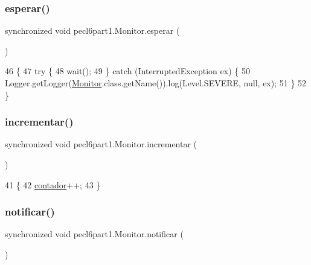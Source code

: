 \subsubsection{\texorpdfstring{esperar()}{esperar()}}
{\footnotesize\ttfamily synchronized void pecl6part1.\+Monitor.\+esperar (\begin{DoxyParamCaption}{ }\end{DoxyParamCaption})\hspace{0.3cm}{\ttfamily [inline]}}


\begin{DoxyCode}
46     \{
47         \textcolor{keywordflow}{try} \{
48             wait();
49         \} \textcolor{keywordflow}{catch} (InterruptedException ex) \{
50             Logger.getLogger(\mbox{\hyperlink{classpecl6part1_1_1_monitor}{Monitor}}.class.getName()).log(Level.SEVERE, null, ex);
51         \}
52     \}
\end{DoxyCode}
\mbox{\label{classpecl6part1_1_1_monitor_afd6c7d222a3849b8406f0f20ab7a2302}} 
\subsubsection{\texorpdfstring{incrementar()}{incrementar()}}
{\footnotesize\ttfamily synchronized void pecl6part1.\+Monitor.\+incrementar (\begin{DoxyParamCaption}{ }\end{DoxyParamCaption})\hspace{0.3cm}{\ttfamily [inline]}}


\begin{DoxyCode}
41     \{
42         \mbox{\hyperlink{classpecl6part1_1_1_monitor_aae725b0e0c2cef21ad644a73bc02b777}{contador}}++;
43     \}
\end{DoxyCode}
\mbox{\label{classpecl6part1_1_1_monitor_a0d517f29c1d3a1bcc10a0fc80283a342}} 
\subsubsection{\texorpdfstring{notificar()}{notificar()}}
{\footnotesize\ttfamily synchronized void pecl6part1.\+Monitor.\+notificar (\begin{DoxyParamCaption}{ }\end{DoxyParamCaption})\hspace{0.3cm}{\ttfamily [inline]}}


